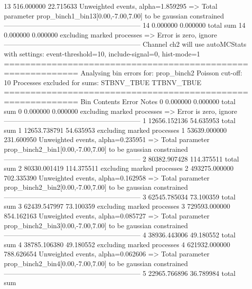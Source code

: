 13         516.000000      22.715633       Unweighted events, alpha=1.859295
  => Total parameter prop_binch1_bin13[0.00,-7.00,7.00] to be gaussian constrained
------------------------------------------------------------
14         0.000000        0.000000        total sum                     
14         0.000000        0.000000        excluding marked processes    
  => Error is zero, ignore      
------------------------------------------------------------
Channel ch2 will use autoMCStats with settings: event-threshold=10, include-signal=0, hist-mode=1
============================================================
Analysing bin errors for: prop_binch2
Poisson cut-off: 10
Processes excluded for sums: STBNV_TBUE TTBNV_TBUE
============================================================
Bin        Contents        Error           Notes                         
0          0.000000        0.000000        total sum                     
0          0.000000        0.000000        excluding marked processes    
  => Error is zero, ignore      
------------------------------------------------------------
1          12656.152136    54.635953       total sum                     
1          12653.738791    54.635953       excluding marked processes    
1          53639.000000    231.600950      Unweighted events, alpha=0.235951
  => Total parameter prop_binch2_bin1[0.00,-7.00,7.00] to be gaussian constrained
------------------------------------------------------------
2          80382.907428    114.375511      total sum                     
2          80330.001419    114.375511      excluding marked processes    
2          493275.000000   702.335390      Unweighted events, alpha=0.162958
  => Total parameter prop_binch2_bin2[0.00,-7.00,7.00] to be gaussian constrained
------------------------------------------------------------
3          62545.785034    73.100359       total sum                     
3          62439.547997    73.100359       excluding marked processes    
3          729593.000000   854.162163      Unweighted events, alpha=0.085727
  => Total parameter prop_binch2_bin3[0.00,-7.00,7.00] to be gaussian constrained
------------------------------------------------------------
4          38936.443006    49.180552       total sum                     
4          38785.106380    49.180552       excluding marked processes    
4          621932.000000   788.626654      Unweighted events, alpha=0.062606
  => Total parameter prop_binch2_bin4[0.00,-7.00,7.00] to be gaussian constrained
------------------------------------------------------------
5          22965.766896    36.789984       total sum                     
